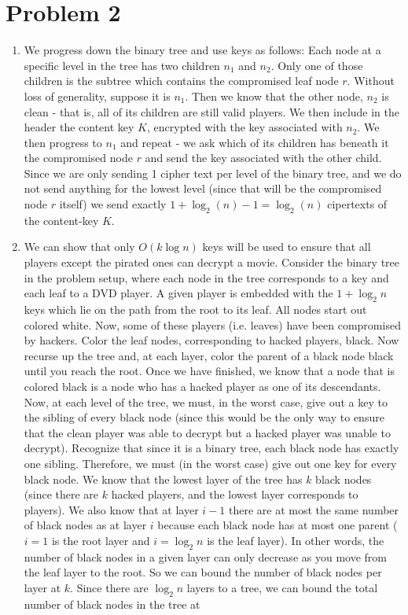 \documentclass{article}
\begin{document}
\section*{Problem 2}
\begin{enumerate}
\item %
We progress down the binary tree and use keys as follows: Each node at a specific level in the tree has two children $n_1$ and $n_2$. Only one of those children is the subtree which contains the compromised leaf node $r$. Without loss of generality, suppose it is $n_1$. Then we know that the other node, $n_2$ is clean - that is, all of its children are still valid players. We then include in the header the content key $K$, encrypted with the key associated with $n_2$. We then progress to $n_1$ and repeat - we ask which of its children has beneath it the compromised node $r$ and send the key associated with the other child. Since we are only sending 1 cipher text per level of the binary tree, and we do not send anything for the lowest level (since that will be the compromised node $r$ itself) we send exactly $1 + \log_{2}(n) - 1 = \log_{2}(n)$ cipertexts of the content-key $K$.

\item %
We can show that only $O(k\log n)$ keys will be used to ensure that all players except the pirated ones can decrypt a movie. Consider the binary tree in the problem setup, where each node in the tree corresponds to a key and each leaf to a DVD player. A given player is embedded with the $1 + \log_2 n$ keys which lie on the path from the root to its leaf. All nodes start out colored white. Now, some of these players (i.e. leaves) have been compromised by hackers. Color the leaf nodes, corresponding to hacked players, black. Now recurse up the tree and, at each layer, color the parent of a black node black until you reach the root. Once we have finished, we know that a node that is colored black is a node who has a hacked player as one of its descendants. Now, at each level of the tree, we must, in the worst case, give out a key to the sibling of every black node (since this would be the only way to ensure that the clean player was able to decrypt but a hacked player was unable to decrypt). Recognize that since it is a binary tree, each black node has exactly one sibling. Therefore, we must (in the worst case) give out one key for every black node. We know that the lowest layer of the tree has $k$ black nodes (since there are $k$ hacked players, and the lowest layer corresponds to players).  We also know that at layer $i-1$ there are at most the same number of black nodes as at layer $i$ because each black node has at most one parent ($i=1$ is the root layer and $i=\log_2 n$ is the leaf layer). In other words, the number of black nodes in a given layer can only decrease as you move from the leaf layer to the root. So we can bound the number of black nodes per layer at $k$. Since there are $\log_2 n$ layers to a tree, we can bound the total number of black nodes in the tree at 


\end{enumerate}
\end{document}
